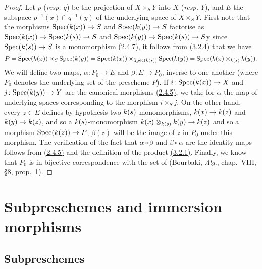 \begin{proof}
\label{proof-prop-1.3.4.9}
Let $p$ (\emph{resp. $q$}) be the projection of $X\times_S Y$ into $X$ (\emph{resp. $Y$}), and $E$ the subspace $p^{-1}(x)\cap q^{-1}(y)$ of the underlying space of $X\times_S Y$.
First note that the morphisms ${\mathop{\mathrm{Spec}}\nolimits}(k(x))\to S$ and ${\mathop{\mathrm{Spec}}\nolimits}(k(y))\to S$ factorise as ${\mathop{\mathrm{Spec}}\nolimits}(k(x))\to{\mathop{\mathrm{Spec}}\nolimits}(k(s))\to S$ and ${\mathop{\mathrm{Spec}}\nolimits}(k(y))\to{\mathop{\mathrm{Spec}}\nolimits}(k(s))\to S$y since ${\mathop{\mathrm{Spec}}\nolimits}(k(s))\to S$ is a monomorphism \hyperref[cor-1.2.4.7]{(2.4.7)}, it follows from \hyperref[prop-1.3.2.4]{(3.2.4)} that we have
\begin{equation*}
    P = {\mathop{\mathrm{Spec}}\nolimits}(k(x))\times_S{\mathop{\mathrm{Spec}}\nolimits}(k(y)) = {\mathop{\mathrm{Spec}}\nolimits}(k(x))\times_{{\mathop{\mathrm{Spec}}\nolimits}(k(s))}{\mathop{\mathrm{Spec}}\nolimits}(k(y)) = {\mathop{\mathrm{Spec}}\nolimits}(k(x)\otimes_{k(s)}k(y)).
\end{equation*}
We will define two maps, $\alpha\colon P_0\to E$ and $\beta\colon E\to P_0$, inverse to one another (where $P_0$ denotes the underlying set of the prescheme $P$).
If $i\colon{\mathop{\mathrm{Spec}}\nolimits}(k(x))\to X$ and $j\colon{\mathop{\mathrm{Spec}}\nolimits}(k(y))\to Y$ are the canonical morphisms \hyperref[env-1.2.4.5]{(2.4.5)}, we take for $\alpha$ the map of underlying spaces corresponding to the morphism $i\times_S j$.
On the other hand, every $z\in E$ defines by hypothesis two $k(s)$-monomorphisms, $k(x)\to k(z)$ and $k(y)\to k(z)$, and so a $k(s)$-monomorphism $k(x)\otimes_{k(s)}k(y)\to k(z)$ and so a morphism ${\mathop{\mathrm{Spec}}\nolimits}(k(z))\to P$; $\beta(z)$ will be the image of $z$ in $P_0$ under this morphism.
The verification of the fact that $\alpha\circ\beta$ and $\beta\circ\alpha$ are the identity maps follows from \hyperref[env-1.2.4.5]{(2.4.5)} and the definition of the product \hyperref[defn-1.3.2.1]{(3.2.1)}.
Finally, we know that $P_0$ is in bijective correspondence with the set of  (Bourbaki, \emph{Alg.}, chap.~VIII, §8, prop.~1).
\end{proof}

\section{Subpreschemes and immersion morphisms}
\label{section-subpreschemes-and-immersion-morphisms}

\subsection{Subpreschemes}
\label{subsection-subpreschemes}

